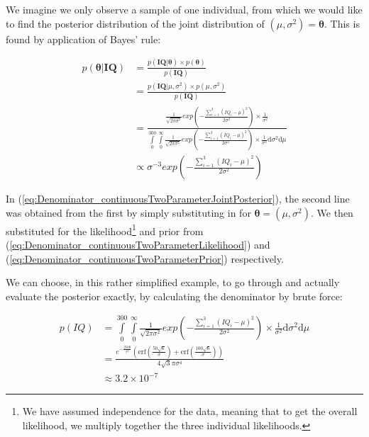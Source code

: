 \documentclass[11pt,fullpage]{book}
\begin{document}
We imagine we only observe a sample of one individual, from which we would like to find the posterior distribution of the joint distribution of $(\mu,\sigma^2)=\boldsymbol{\theta}$. This is found by application of Bayes' rule:

\begin{equation}\label{eq:Denominator_continuousTwoParameterJointPosterior}
\begin{align}
p(\boldsymbol{\theta}|\boldsymbol{IQ}) &= \frac{p(\boldsymbol{IQ}|\boldsymbol{\theta})\times p(\boldsymbol{\theta})}{p(\boldsymbol{IQ})}\\
&= \frac{p(\boldsymbol{IQ}|\mu,\sigma^2)\times p(\mu,\sigma^2)}{p(\boldsymbol{IQ})}\\
&= \frac{\frac{1}{\sqrt{2\pi\sigma^2}} exp\left(-\frac{\sum\limits_{i=1}^{3}(IQ_i-\mu)^2}{2\sigma^2}\right)\times\frac{1}{\sigma^2}}{\int\limits_{0}^{300}\int\limits_{0}^{\infty}\frac{1}{\sqrt{2\pi\sigma^2}} exp\left(-\frac{\sum\limits_{i=1}^{3}(IQ_i-\mu)^2}{2\sigma^2}\right)\times\frac{1}{\sigma^2}\mathrm{d}\sigma^2\mathrm{d}\mu}\\
&\propto \sigma^{-3} exp\left(-\frac{\sum\limits_{i=1}^{3}(IQ_i-\mu)^2}{2\sigma^2}\right)
\end{align}
\end{equation} 

In (\ref{eq:Denominator_continuousTwoParameterJointPosterior}), the second line was obtained from the first by simply substituting in for $\boldsymbol{\theta}=(\mu,\sigma^2)$. We then substituted for the likelihood\footnote{We have assumed independence for the data, meaning that to get the overall likelihood, we multiply together the three individual likelihoods.} and prior from (\ref{eq:Denominator_continuousTwoParameterLikelihood}) and (\ref{eq:Denominator_continuousTwoParameterPrior}) respectively. 

We can choose, in this rather simplified example, to go through and actually evaluate the posterior exactly, by calculating the denominator by brute force:

\begin{equation}
\begin{align}
p(IQ)&=\int\limits_{0}^{300}\int\limits_{0}^{\infty}\frac{1}{\sqrt{2\pi\sigma^2}} exp\left(-\frac{\sum\limits_{i=1}^{3}(IQ_i-\mu)^2}{2\sigma^2}\right)\times\frac{1}{\sigma^2}\mathrm{d}\sigma^2\mathrm{d}\mu\\
&= \frac{e^{-\frac{2500}{\sigma ^2}} \left(\text{erf}\left(\frac{50 \sqrt{6}}{\sigma }\right)+\text{erf}\left(\frac{100 \sqrt{6}}{\sigma }\right)\right)}{4
   \sqrt{3} \pi  \sigma ^4}\\
&\approx 3.2\times 10^{-7}
\end{align}
\end{equation}
\end{document}
